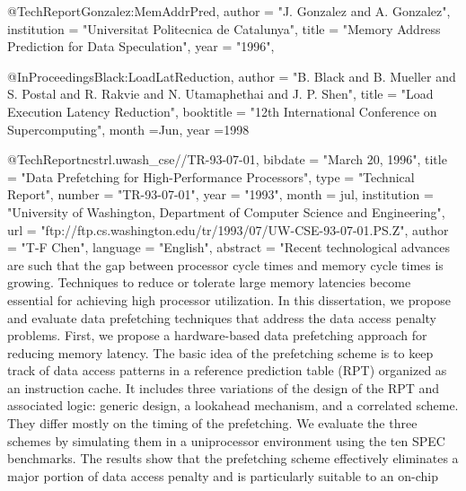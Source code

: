 @TechReport{Gonzalez:MemAddrPred,
  author =       "J. Gonzalez and A. Gonzalez",
  institution =  "Universitat Politecnica de Catalunya",
  title =        "Memory Address Prediction for Data Speculation",
  year =         "1996",
}

@InProceedings{Black:LoadLatReduction,
  author =       "B. Black and B. Mueller and S. Postal and R. Rakvie and N. Utamaphethai and J. P. Shen",
  title =        "Load Execution Latency Reduction",
  booktitle =    "12th International Conference on Supercomputing",
  month           =Jun,
  year            =1998
}





@TechReport{ncstrl.uwash_cse//TR-93-07-01,
  bibdate =      "March 20, 1996",
  title =        "Data Prefetching for High-Performance Processors",
  type =         "Technical Report",
  number =       "TR-93-07-01",
  year =         "1993",
  month =        jul,
  institution =  "University of Washington, Department of Computer
                 Science and Engineering",
  url =          "ftp://ftp.cs.washington.edu/tr/1993/07/UW-CSE-93-07-01.PS.Z",
  author =       "T-F Chen",
  language =     "English",
  abstract =     "Recent technological advances are such that the gap
                 between processor cycle times and memory cycle times is
                 growing. Techniques to reduce or tolerate large memory
                 latencies become essential for achieving high processor
                 utilization. In this dissertation, we propose and
                 evaluate data prefetching techniques that address the
                 data access penalty problems. First, we propose a
                 hardware-based data prefetching approach for reducing
                 memory latency. The basic idea of the prefetching
                 scheme is to keep track of data access patterns in a
                 reference prediction table (RPT) organized as an
                 instruction cache. It includes three variations of the
                 design of the RPT and associated logic: generic design,
                 a lookahead mechanism, and a correlated scheme. They
                 differ mostly on the timing of the prefetching. We
                 evaluate the three schemes by simulating them in a
                 uniprocessor environment using the ten SPEC benchmarks.
                 The results show that the prefetching scheme
                 effectively eliminates a major portion of data access
                 penalty and is particularly suitable to an on-chip
}
